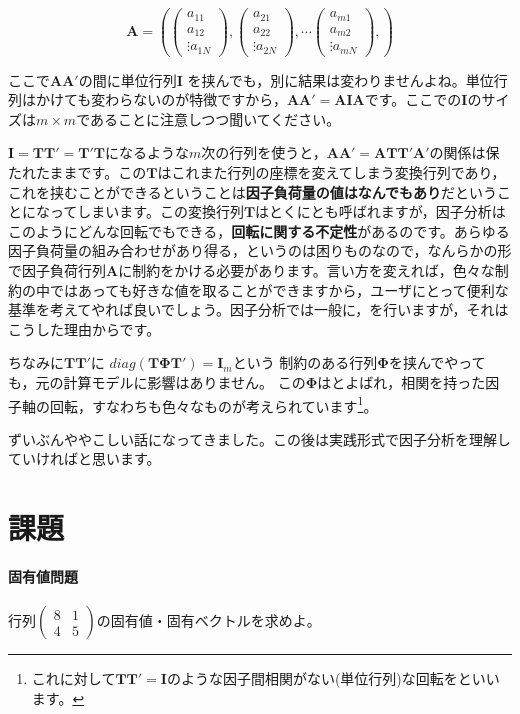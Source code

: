 \documentclass{ltjsbook}
\begin{document}
\[
    \bm{A} = \left (
    \begin{pmatrix}  a_{11}\\a_{12}\\\vdots a_{1N} \end{pmatrix},
    \begin{pmatrix}  a_{21}\\a_{22}\\\vdots a_{2N} \end{pmatrix},
    \cdots
    \begin{pmatrix}  a_{m1}\\a_{m2}\\\vdots a_{mN} \end{pmatrix},
    \right )
\]

ここで$\bm{AA'}$の間に単位行列$\bm{I}$ を挟んでも，別に結果は変わりませんよね。単位行列はかけても変わらないのが特徴ですから，$\bm{AA'}=\bm{AIA}$です。ここでの$\bm{I}$のサイズは$m \times m$であることに注意しつつ聞いてください。

$\bm{I} = \bm{TT'}=\bm{T'T}$になるような$m$次の行列を使うと，$\bm{AA'} = \bm{ATT'A'}$の関係は保たれたままです。この$\bm{T}$はこれまた行列の座標を変えてしまう変換行列であり，これを挟むことができるということは\textbf{因子負荷量の値はなんでもあり}だということになってしまいます。この変換行列$\bm{T}$はとくにとも呼ばれますが，因子分析はこのようにどんな回転でもできる，\textbf{回転に関する不定性}があるのです。あらゆる因子負荷量の組み合わせがあり得る，というのは困りものなので，なんらかの形で因子負荷行列$\bm{A}$に制約をかける必要があります。言い方を変えれば，色々な制約の中ではあっても好きな値を取ることができますから，ユーザにとって便利な基準を考えてやれば良いでしょう。因子分析では一般に，を行いますが，それはこうした理由からです。

ちなみに$\bm{TT'}$に
$diag(\bm{T\Phi T'})=\bm{I}_m$という
制約のある行列$\bm{\Phi}$を挟んでやっても，元の計算モデルに影響はありません。
この$\bm{\Phi}$はとよばれ，相関を持った因子軸の回転，すなわちも色々なものが考えられています\footnote{これに対して$\bm{TT'}=\bm{I}$のような因子間相関がない(単位行列)な回転をといいます。}。


ずいぶんややこしい話になってきました。この後は実践形式で因子分析を理解していければと思います。

\section{課題}
\paragraph{固有値問題}行列$\begin{pmatrix}8&1\\4&5\end{pmatrix}$の固有値・固有ベクトルを求めよ。
\end{document}
